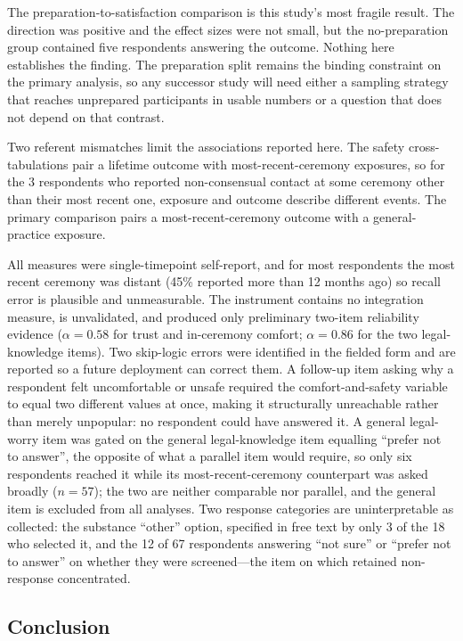 \documentclass[12pt]{article}
\begin{document}
The preparation-to-satisfaction comparison is this study's most fragile result. The direction was positive
and the effect sizes were not small, but the no-preparation group contained five respondents answering the
outcome. Nothing here establishes the finding. The preparation split remains the binding constraint on the
primary analysis, so any successor study will need either a sampling strategy that reaches unprepared
participants in usable numbers or a question that does not depend on that contrast.

Two referent mismatches limit the associations reported here. The safety cross-tabulations pair a lifetime
outcome with most-recent-ceremony exposures, so for the 3 respondents who reported non-consensual contact at
some ceremony other than their most recent one, exposure and outcome describe different events. The primary
comparison pairs a most-recent-ceremony outcome with a general-practice exposure.

All measures were single-timepoint self-report, and for most respondents the most recent ceremony was
distant (45\% reported more than 12 months ago) so recall error is plausible and unmeasurable. The
instrument contains no integration measure, is unvalidated, and produced only preliminary two-item
reliability evidence ($\alpha=0.58$ for trust and in-ceremony comfort; $\alpha=0.86$ for the two
legal-knowledge items). Two skip-logic errors were identified in the fielded form and are reported so a
future deployment can correct them. A follow-up item asking why a respondent felt uncomfortable or unsafe
required the comfort-and-safety variable to equal two different values at once, making it structurally
unreachable rather than merely unpopular: no respondent could have answered it. A general legal-worry item
was gated on the general legal-knowledge item equalling ``prefer not to answer'', the opposite of what a
parallel item would require, so only six respondents reached it while its most-recent-ceremony counterpart
was asked broadly ($n=57$); the two are neither comparable nor parallel, and the general item is excluded
from all analyses. Two
response categories are uninterpretable as collected: the substance ``other'' option, specified in free text
by only 3 of the 18 who selected it, and the 12 of 67 respondents answering ``not sure'' or ``prefer not to
answer'' on whether they were screened---the item on which retained non-response concentrated.

\subsection{Conclusion}
\end{document}
